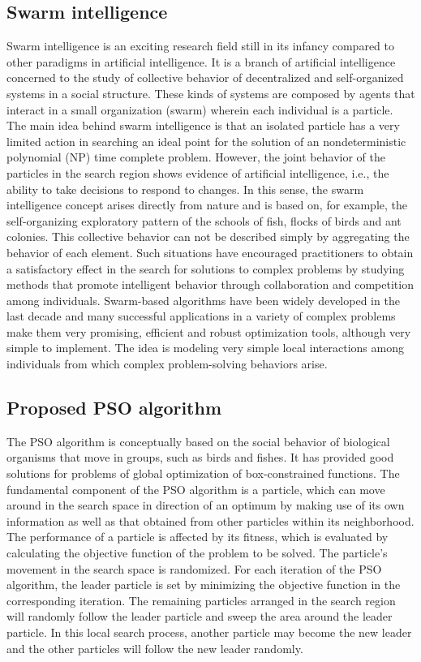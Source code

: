 \documentclass[10pt,letterpaper]{article}
\begin{document}
\subsection{Swarm intelligence}

Swarm intelligence is an exciting research field still in its infancy  compared to other paradigms in artificial intelligence.
It is a branch of artificial intelligence concerned to the study of collective behavior of decentralized and self-organized systems in a social structure.
These kinds of systems are composed by agents that interact in a small organization (swarm) wherein each individual is a particle.
The main idea behind swarm intelligence is that an isolated particle has a very limited action in searching an ideal point for the solution of an nondeterministic polynomial (NP) time complete problem.
However, the joint behavior of the particles in the search region shows evidence of artificial intelligence,
i.e., the ability to take decisions to respond to changes.
In this sense, the swarm intelligence concept arises directly from nature and is based on, for example,
the self-organizing exploratory pattern of the schools of fish, flocks of birds and ant colonies.
This collective behavior can not be described simply by aggregating the behavior of each element.
Such situations have  encouraged practitioners to obtain a satisfactory effect in the search for solutions to complex problems
by studying methods that promote intelligent behavior through collaboration and competition among individuals.
Swarm-based algorithms have been widely developed in the last decade and many successful
applications in a variety of complex problems make them very promising, efficient and robust optimization tools, although very simple to implement.
The idea is modeling very simple local interactions among individuals from which complex problem-solving behaviors arise.

\subsection{Proposed PSO algorithm}

The PSO algorithm is conceptually based on the social behavior of biological organisms that move in groups, such as birds and fishes.
It has provided good solutions for problems of global optimization of box-constrained functions.
The fundamental component of the PSO algorithm is a particle, which can move around in the search space in direction
of an optimum by making use of its own information as well as that obtained from other particles within its neighborhood.
The performance of a particle is affected by its fitness,  which is evaluated by calculating the objective function of the problem to be solved.
The particle's movement in the search space is randomized.
For each iteration of the PSO algorithm, the leader particle is set by minimizing the objective function in the corresponding iteration.
The remaining particles arranged in the search region will randomly follow the leader particle and sweep the area around the leader particle.
In this local search process, another particle may become the new leader and the other particles will follow the new leader randomly.
\end{document}
